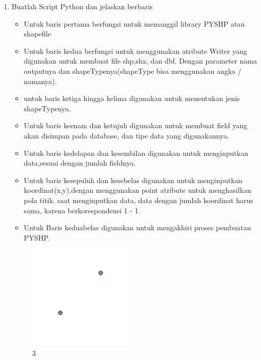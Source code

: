 \begin{enumerate}
	\item Buatlah Script Python dan jelaskan berbaris
	
	\begin{itemize}
		\item Untuk baris pertama berfungsi untuk memanggil library PYSHP atau shapefile
		\item Untuk baris kedua berfungsi untuk menggunakan atribute Writer yang digunakan untuk membuat file shp,shx, dan dbf. \hfill\break Dengan parameter nama outputnya dan shapeTypenya(shapeType bisa menggunakan angka / namanya).
		\item untuk baris ketiga hingga kelima digunakan untuk menentukan jenis shapeTypenya.
		\item Untuk baris keenam dan ketujuh digunakan untuk membuat field yang akan disimpan pada database, dan tipe data yang digunakannya.
		\item Untuk baris kedelapan dan kesembilan digunakan untuk menginputkan data,sesuai dengan jumlah fieldnya.
		\item Untuk baris kesepuluh dan kesebelas digunakan untuk menginputkan koordinat(x,y),dengan menggunakan point atribute untuk menghasilkan pola titik. \hfill\break
		saat menginputkan data, data dengan jumlah koordinat harus sama, karena berkorespondensi 1 - 1.
		\item Untuk Baris keduabelas digunakan untuk mengakhiri proses pembuatan PYSHP.
	\end{itemize}
	\hfill\break
	\begin{figure}[H]
		\includegraphics[width=5cm]{figures/1174009/2/3.png}
		\centering
		\caption{ 3}
	\end{figure}


\end{enumerate}
